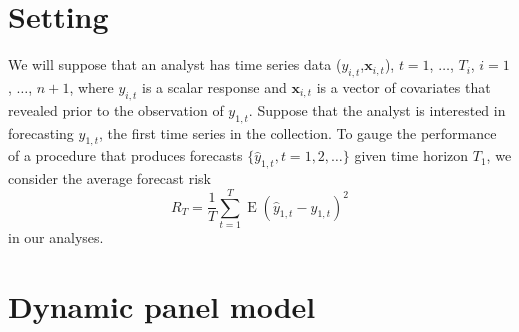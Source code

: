 \documentclass[11pt]{article}
\newcommand{\x}{\textbf{x}}
\DeclareMathOperator{\E}{E}
\begin{document}
\section{Setting}

We will suppose that an analyst has time series data ($y_{i,t}$,$\x_{i,t}$), 
$t = 1$, $\ldots$, $T_i$, $i = 1$, $\ldots$, $n+1$, where $y_{i,t}$ is a 
scalar response and $\x_{i,t}$ is a vector of covariates that revealed prior 
to the observation of $y_{1,t}$.  Suppose that the analyst is interested in 
forecasting $y_{1,t}$, the first time series in the collection.
To gauge the performance of a procedure that produces forecasts 
$\{\hat y_{1,t}, t= 1,2,\ldots\}$ given time horizon $T_1$, we consider the 
average forecast risk
$$
  R_T = \frac{1}{T}\sum_{t=1}^T\E(\hat y_{1,t} - y_{1,t})^2
$$
in our analyses.


\section{Dynamic panel model}
\label{sec:dpm}
\end{document}
